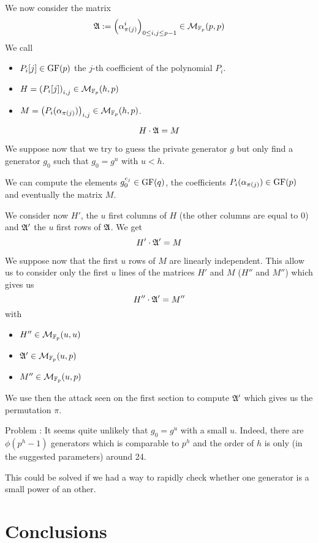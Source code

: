 \documentclass[12pt,a4paper,titlepage]{article}
\begin{document}
We now consider the matrix
$$ \frak{A} := \left( \alpha_{\pi(j)}^i \right)_{0 \leq i,j \leq p-1} \in \mathcal{M}_{\mathbb{F}_p}(p,p)$$
We call
\begin{itemize}
\item $P_i[j] \in \text{GF}(p)$ the $j$-th coefficient of the polynomial $P_i$.
\item $H = \left( P_i[j] \right)_{i,j} \in \mathcal{M}_{\mathbb{F}_p}(h,p)$
\item $M = \left( P_i(\alpha_{\pi(j)}) \right)_{i,j} \in \mathcal{M}_{\mathbb{F}_p}(h,p)$.
\end{itemize}

$$ H \cdot \frak{A} = M $$

We suppose now that we try to guess the private generator $g$ but only find a generator $g_0$ such that $g_0 = g^u$ with $u < h$.

We can compute the elements $g_0^{c_j} \in \text{GF}(q)$, the coefficients $P_i(\alpha_{\pi(j)}) \in \text{GF}(p)$ and eventually the matrix $M$.

We consider now $H'$, the $u$ first columns of $H$ (the other columns are equal to 0) and $\frak{A}'$ the $u$ first rows of $\frak{A}$.
We get
$$ H' \cdot \frak{A}' = M $$

We suppose now that the first $u$ rows of $M$ are linearly independent. This allow us to consider only the first $u$ lines of the matrices $H'$ and $M$ ($H''$ and $M''$) which gives us
$$ H'' \cdot \frak{A}' = M'' $$
with
\begin{itemize}
\item $H'' \in \mathcal{M}_{\mathbb{F}_p}(u,u)$
\item $\frak{A}' \in \mathcal{M}_{\mathbb{F}_p}(u,p)$
\item $M'' \in \mathcal{M}_{\mathbb{F}_p}(u,p)$
\end{itemize}

We use then the attack seen on the first section to compute $\frak{A}'$ which gives us the permutation $\pi$.

Problem :
It seems quite unlikely that $g_0 = g^u$ with a small $u$.
Indeed, there are $\phi(p^h-1)$ generators which is comparable to $p^h$ and the order of $h$ is only (in the suggested parameters) around 24. 

This could be solved if we had a way to rapidly check whether one generator is a small power of an other.





\section{Conclusions}






\newpage
\appendix
\end{document}
